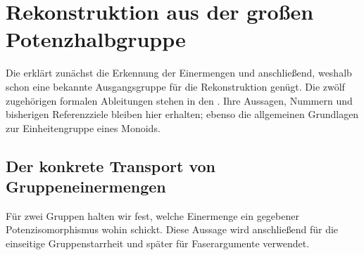 \documentclass[main.tex]{subfiles}
\begin{document}
\begin{tabproof}
\end{tabproof}

\section{Rekonstruktion aus der großen Potenzhalbgruppe}

\hypertarget{reconstruction.main}{}
Die \ReconstructionReadingLink{} erklärt zunächst die Erkennung der
Einermengen und anschließend, weshalb schon eine bekannte Ausgangsgruppe
für die Rekonstruktion genügt. Die zwölf zugehörigen formalen Ableitungen
stehen in den \ReconstructionProofsLink{}.
Ihre Aussagen, Nummern und bisherigen Referenzziele bleiben hier erhalten;
ebenso die allgemeinen Grundlagen zur Einheitengruppe eines Monoids.

\subsection{Der konkrete Transport von Gruppeneinermengen}

Für zwei Gruppen halten wir fest, welche Einermenge ein gegebener
Potenzisomorphismus wohin schickt. Diese Aussage wird anschließend
für die einseitige Gruppenstarrheit und später für Faserargumente verwendet.

\begin{tabproof}
\end{tabproof}
\end{document}
